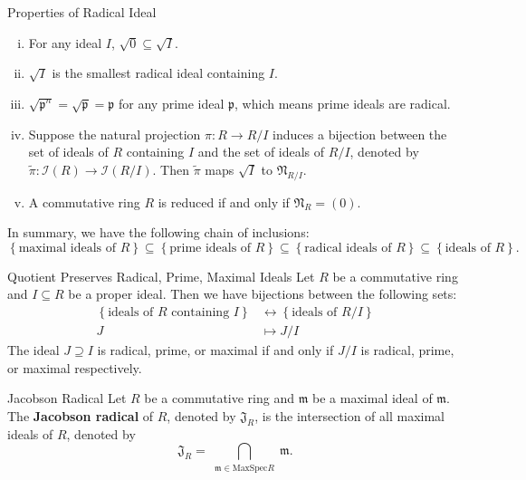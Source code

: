 \begin{proposition}{Properties of Radical Ideal}{}
    \begin{enumerate}[(i)]
        \item For any ideal $I$, $\sqrt{0}\subseteq \sqrt{I}$.
        \item $\sqrt{I}$ is the smallest radical ideal containing $I$.
        \item $\sqrt{\mathfrak{p}^n}=\sqrt{\mathfrak{p}}=\mathfrak{p}$ for any prime ideal $\mathfrak{p}$, which means prime ideals are radical.
        \item Suppose the natural projection $\pi: R\to R/I$ induces a bijection between the set of ideals of $R$ containing $I$ and the set of ideals of $R/I$, denoted by $\tilde{\pi}:\mathcal{I}(R)\to\mathcal{I}(R/I)$. Then $\tilde{\pi}$ maps $\sqrt{I}$ to $\mathfrak{N}_{R/I}$.
        \item A commutative ring $R$ is reduced if and only if $\mathfrak{N}_R=(0)$. 
    \end{enumerate}
\end{proposition}

In summary, we have the following chain of inclusions:
\[
\left\{\text{maximal ideals of }R\right\} \subseteq \left\{\text{prime ideals of }R\right\} \subseteq \left\{\text{radical ideals of }R\right\} \subseteq \left\{\text{ideals of }R\right\}.
\]
\begin{proposition}{Quotient Preserves Radical, Prime, Maximal Ideals}{}
    Let $R$ be a commutative ring and $I\subseteq R$ be a proper ideal. Then we have bijections between the following sets:
    \begin{align*}
        \left\{\text{ideals of }R\text{ containing }I\right\}&\longleftrightarrow\left\{\text{ideals of }R/I\right\}\\
        J&\longmapsto J/I
    \end{align*}
    The ideal $J\supseteq I$ is radical, prime, or maximal if and only if $J/I$ is radical, prime, or maximal respectively.
\end{proposition}

\begin{definition}{Jacobson Radical}{}
    Let $R$ be a commutative ring and $\mathfrak{m}$ be a maximal ideal of $\mathfrak{m}$. The \textbf{Jacobson radical} of $R$, denoted by $\mathfrak{J}_R$, is the intersection of all maximal ideals of $R$, denoted by
    \[
        \mathfrak{J}_R=\bigcap_{\substack{\mathfrak{m} \in \mathrm{MaxSpec} R }} \mathfrak{m}.
            \]
    
\end{definition}


